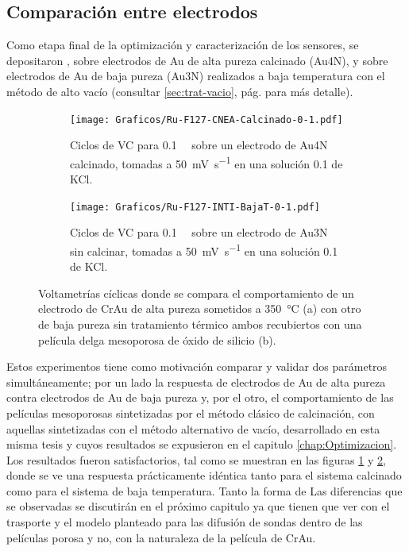     \subsection{Comparación entre electrodos}


    	Como etapa final de la optimización y caracterización de los sensores, se depositaron \pdm, sobre electrodos de Au de alta pureza calcinado (Au4N), y sobre electrodos de Au de baja pureza (Au3N) realizados a baja temperatura con el método de alto vacío (consultar \ref{sec:trat-vacio}, pág. \pageref{sec:trat-vacio} para más detalle). 

    			 \begin{figure}[ht!]
		 	      \begin{subfigure}[t]{0.495\textwidth}
		          	\texttt{[image: Graficos/Ru-F127-CNEA-Calcinado-0-1.pdf]}
		         	\caption{Ciclos de VC para \ru\space \SI{0.1}{\milli\Molar} sobre un electrodo de Au4N calcinado, tomadas a \SI{50}{\milli\volt\per\second} en una solución \SI{0.1}{\Molar} de KCl.}
		          	\label{fig:Au4N-Ru1mM}
		      		\end{subfigure}
		      	 \begin{subfigure}[t]{0.495\textwidth}
		          	\texttt{[image: Graficos/Ru-F127-INTI-BajaT-0-1.pdf]}
		         	\caption{Ciclos de VC para \ru\space \SI{0.1}{\milli\Molar} sobre un electrodo de Au3N sin calcinar, tomadas a \SI{50}{\milli\volt\per\second} en una solución \SI{0.1}{\Molar} de KCl.}
		          	\label{fig:Au3N-Ru1mM}
		      		\end{subfigure}
		      	 \caption[Comparación \pdm\space sobre diferentes electrodos]{Voltametrías cíclicas donde se compara el comportamiento de un electrodo de Cr\textbar Au de alta pureza sometidos a \SI{350}{\celsius} (a) con otro de baja pureza sin tratamiento térmico ambos recubiertos con una película delga mesoporosa de óxido de silicio (b).}
		      	 \label{fig:Comparacion-meso}
	      		 \end{figure}
	    
	    Estos experimentos tiene como motivación comparar y validar dos parámetros simultáneamente; por un lado la respuesta de electrodos de Au de alta pureza contra electrodos de Au de baja pureza y, por el otro, el comportamiento de las películas mesoporosas sintetizadas por el método clásico de calcinación, con aquellas sintetizadas con el método alternativo de vacío, desarrollado en esta misma tesis y cuyos resultados se expusieron en el capitulo \ref{chap:Optimizacion}.
    	Los resultados fueron satisfactorios, tal como se muestran en las figuras \ref{fig:Au4N-Ru1mM} y \ref{fig:Au3N-Ru1mM}, donde se ve una respuesta prácticamente idéntica tanto para el sistema calcinado como para el sistema de baja temperatura. 
    	Tanto la forma de Las diferencias que se observadas se discutirán en el próximo capitulo ya que tienen que ver con el trasporte y el modelo planteado para las difusión de sondas dentro de las películas porosa y no, con la naturaleza de la película de Cr\textbar Au.


